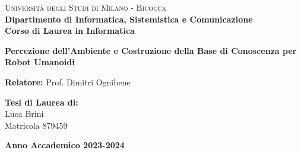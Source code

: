 


\begin{titlepage}

    \noindent
    \begin{minipage}[t]{0.19\textwidth}
    \end{minipage}
    \hspace{2mm}
    \begin{minipage}[t]{0.70\textwidth}
        {
            {\textsc{Università degli Studi di Milano - Bicocca}} \\
            \textbf{Dipartimento di Informatica, Sistemistica e Comunicazione} \\
            \textbf{Corso di Laurea in Informatica} \\
            \par
        }
    \end{minipage}

    \vspace{40mm}

    \begin{center}
        {\LARGE{
                \textbf{Percezione dell'Ambiente e Costruzione della Base di Conoscenza per Robot Umanoidi}
                \par
            }}
    \end{center}

    \vspace{50mm}

    \noindent
    {\large \textbf{Relatore:} Prof. Dimitri Ognibene } \\

    \vspace{15mm}

    \begin{flushright}
        {\large \textbf{Tesi di Laurea di:}} \\
        \large{Luca Brini} \\
        \large{Matricola 879459}
    \end{flushright}

    \vspace{20mm}
    \begin{center}
        {\large{\bf Anno Accademico 2023-2024}}
    \end{center}


\end{titlepage}

